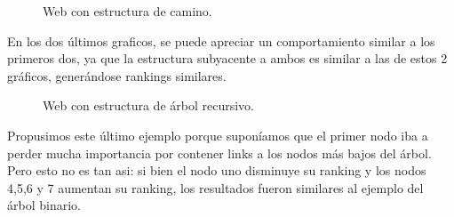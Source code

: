 \begin{figure}[H]
\centering     %
{}
\caption{Web con estructura de camino.}
\end{figure}

En los dos últimos graficos, se puede apreciar un comportamiento similar a los primeros dos, ya que la estructura subyacente a ambos es similar a las de estos 2 gráficos, generándose rankings similares.   



\begin{figure}[H]
\centering     %
{}
\caption{Web con estructura de árbol recursivo.}
\end{figure}

Propusimos este último ejemplo porque suponíamos que el primer nodo iba a perder mucha importancia por contener links a los nodos más bajos del árbol. Pero esto no es tan asi: si bien el nodo uno disminuye su ranking y los nodos 4,5,6 y 7 aumentan su ranking, los resultados fueron similares al ejemplo del árbol binario. 

